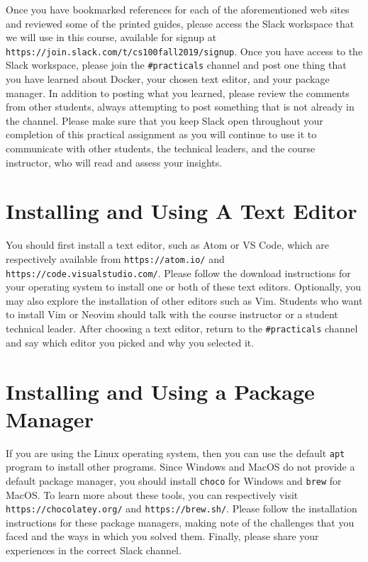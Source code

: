 \documentclass[11pt]{article}
\newcommand{\program}[1]{\lstinline{#1}}
\newcommand{\url}[1]{\lstinline{#1}}
\begin{document}
Once you have bookmarked references for each of the aforementioned web sites and
reviewed some of the printed guides, please access the Slack workspace that we
will use in this course, available for signup at
\url{https://join.slack.com/t/cs100fall2019/signup}. Once you have access to
the Slack workspace, please join the \url{#practicals} channel and post one
thing that you have learned about Docker, your chosen text editor, and your
package manager. In addition to posting what you learned, please review the
comments from other students, always attempting to post something that is not
already in the channel. Please make sure that you keep Slack open throughout
your completion of this practical assignment as you will continue to use it to
communicate with other students, the technical leaders, and the course
instructor, who will read and assess your insights.

\section*{Installing and Using A Text Editor}

You should first install a text editor, such as Atom or VS Code, which are
respectively available from \url{https://atom.io/} and
\url{https://code.visualstudio.com/}. Please follow the download instructions
for your operating system to install one or both of these text editors.
Optionally, you may also explore the installation of other editors such as Vim.
Students who want to install Vim or Neovim should talk with the course
instructor or a student technical leader. After choosing a text editor, return
to the \url{#practicals} channel and say which editor you picked and why you
selected it.

\section*{Installing and Using a Package Manager}

If you are using the Linux operating system, then you can use the default
\program{apt} program to install other programs. Since Windows and MacOS do not
provide a default package manager, you should install \program{choco} for
Windows and \program{brew} for MacOS. To learn more about these tools, you can
respectively visit \url{https://chocolatey.org/} and \url{https://brew.sh/}.
Please follow the installation instructions for these package managers, making
note of the challenges that you faced and the ways in which you solved them.
Finally, please share your experiences in the correct Slack channel.
\end{document}
